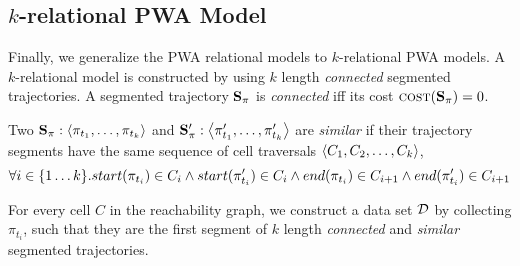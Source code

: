 \subsection{$k$-relational PWA Model}

Finally, we generalize the PWA relational models to $k$-relational PWA
models. A $k$-relational model is constructed by using $k$ length
\textit{connected} segmented trajectories. A segmented trajectory $\mathbf{S}_\pi$ is
\textit{connected} iff its cost $\mbox{\sc cost}(\mathbf{S}_\pi) = 0$.

Two $\mathbf{S}_\pi:\left\langle \pi_{t_1}, \ldots, \pi_{t_k} \right \rangle$ and
$\mathbf{S}_\pi':\left\langle \pi'_{t_1}, \ldots, \pi'_{t_k} \right \rangle$ are
\textit{similar} if their trajectory segments have the same sequence
of cell traversals $\left\langle C_1, C_2, \ldots, C_k \right \rangle$, \ie
\[
    \forall i\in\{1 \ldots k\}.
    start(\pi_{t_i}) \in C_i
    \land start(\pi'_{t_i}) \in C_i
    \land end(\pi_{t_i}) \in C_{i+1}
    \land end(\pi'_{t_i}) \in C_{i+1}
\]

For every cell $C$ in the reachability graph, we construct a data set
$\mathcal{D}$ by collecting $\pi_{t_i}$, such that they are the first segment of $k$
length \textit{connected} and \textit{similar} segmented trajectories.



